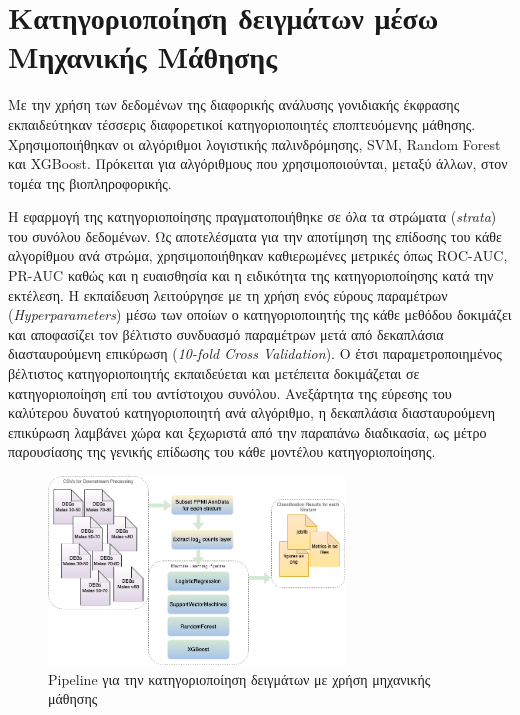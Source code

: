 \documentclass[12pt]{report}
\begin{document}
    \section{Κατηγοριοποίηση δειγμάτων μέσω Μηχανικής Μάθησης}
        \par
            Με την χρήση των δεδομένων της διαφορικής ανάλυσης γονιδιακής έκφρασης εκπαιδεύτηκαν τέσσερις διαφορετικοί κατηγοριοποιητές εποπτευόμενης μάθησης. Χρησιμοποιήθηκαν οι αλγόριθμοι λογιστικής παλινδρόμησης, SVM, Random Forest και XGBoost. Πρόκειται για αλγόριθμους που χρησιμοποιούνται, μεταξύ άλλων, στον τομέα της βιοπληροφορικής.
        \par
            Η εφαρμογή της κατηγοριοποίησης πραγματοποιήθηκε σε όλα τα στρώματα (\emph{strata}) του συνόλου δεδομένων. Ως αποτελέσματα για την αποτίμηση της επίδοσης του κάθε αλγορίθμου ανά στρώμα, χρησιμοποιήθηκαν καθιερωμένες μετρικές όπως ROC-AUC, PR-AUC καθώς και η ευαισθησία και η ειδικότητα της κατηγοριοποίησης κατά την εκτέλεση. Η εκπαίδευση λειτούργησε με τη χρήση ενός εύρους παραμέτρων (\emph{Hyperparameters}) μέσω των οποίων ο κατηγοριοποιητής της κάθε μεθόδου δοκιμάζει και αποφασίζει τον βέλτιστο συνδυασμό παραμέτρων μετά από δεκαπλάσια διασταυρούμενη επικύρωση (\emph{10-fold Cross Validation}). Ο έτσι παραμετροποιημένος βέλτιστος κατηγοριοποιητής εκπαιδεύεται και μετέπειτα δοκιμάζεται σε κατηγοριοποίηση επί του αντίστοιχου συνόλου. Ανεξάρτητα της εύρεσης του καλύτερου δυνατού κατηγοριοποιητή ανά αλγόριθμο, η δεκαπλάσια διασταυρούμενη επικύρωση λαμβάνει χώρα και ξεχωριστά από την παραπάνω διαδικασία, ως μέτρο παρουσίασης της γενικής επίδωσης του κάθε μοντέλου κατηγοριοποίησης.
            \begin{figure}[h]
                \centering
                \includegraphics[width=0.7\textwidth]{ML/msci-big-pic-ML-blocks.png}
                \caption{Pipeline για την κατηγοριοποίηση δειγμάτων με χρήση μηχανικής μάθησης}
                \label{fig:msci-big-pic-ML-blocks}
            \end{figure}
\end{document}
